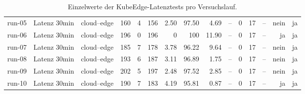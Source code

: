 \begin{table}
{\begin{tabular}{l l p{3.2cm} r r r r r r r r r r r r}
run-05 & Latenz 30min & cloud--edge & 160 & 4 & 156 & 2.50 & 97.50 & 4.69 & -- & 0 & 17 & -- & nein & ja \\
run-06 & Latenz 30min & cloud--edge & 196 & 0 & 196 & 0 & 100 & 11.90 & -- & 0 & 17 & -- & ja & ja \\
run-07 & Latenz 30min & cloud--edge & 185 & 7 & 178 & 3.78 & 96.22 & 9.64 & -- & 0 & 17 & -- & nein & ja \\
run-08 & Latenz 30min & cloud--edge & 193 & 6 & 187 & 3.11 & 96.89 & 1.75 & -- & 0 & 17 & -- & nein & ja \\
run-09 & Latenz 30min & cloud--edge & 202 & 5 & 197 & 2.48 & 97.52 & 2.85 & -- & 0 & 17 & -- & nein & ja \\
run-10 & Latenz 30min & cloud--edge & 190 & 7 & 183 & 4.19 & 95.81 & 0.87 & -- & 0 & 17 & -- & ja & ja \\
\bottomrule
\end{tabular}%
}
\caption{Einzelwerte der KubeEdge-Latenztests pro Versuchslauf.}
\label{tab:appendix-kubeedge-latency-runs}
\end{table}

